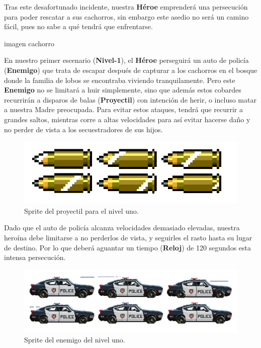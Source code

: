 \documentclass{article}
\begin{document}
Tras este desafortunado incidente, nuestra \textbf{Héroe} emprenderá una persecución para poder rescatar a sus cachorros, sin embargo este asedio no será un camino fácil, pues no sabe a qué tendrá que enfrentarse.

\vspace{5mm}
imagen cachorro
\vspace{5mm}

En nuestro primer escenario (\textbf{Nivel-1}), el \textbf{Héroe} perseguirá un auto de policía (\textbf{Enemigo}) que trata de escapar después de capturar a los cachorros en el bosque donde la familia de lobos se encontraba viviendo tranquilamente. Pero este \textbf{Enemigo} no se limitará a huir simplemente, sino que además estos cobardes recurrirán a disparos de balas (\textbf{Proyectil}) con intención de herir, o incluso matar a nuestra Madre preocupada. Para evitar estos ataques, tendrá que recurrir a grandes saltos, mientras corre a altas velocidades para así evitar hacerse daño y no perder de vista a los secuestradores de sus hijos.

\begin{figure}[h]
\includegraphics[scale=0.7]{Images/spriteproyectil.png}
\centering
\caption{Sprite del proyectil para el nivel uno.}
\label{fig:spriteproy}
\end{figure}

Dado que el auto de policía alcanza velocidades demasiado elevadas, nuestra heroína debe limitarse a no perderlos de vista, y seguirles el rasto hasta su lugar de destino. Por lo que deberá aguantar un tiempo (\textbf{Reloj}) de 120 segundos esta intensa persecución.

\begin{figure}[h]
\includegraphics[scale=0.4]{Images/spritecarro.png}
\centering
\caption{Sprite del enemigo del nivel uno.}
\label{fig:spriteproy}
\end{figure}
\end{document}
